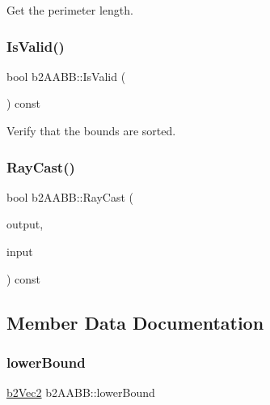 Get the perimeter length. 

\mbox{\label{structb2_a_a_b_b_a70bb45c086fcc2d7ee8694deb386070e}} 
\subsubsection{\texorpdfstring{IsValid()}{IsValid()}}
{\footnotesize\ttfamily bool b2\+A\+A\+B\+B\+::\+Is\+Valid (\begin{DoxyParamCaption}{ }\end{DoxyParamCaption}) const\hspace{0.3cm}{\ttfamily [inline]}}



Verify that the bounds are sorted. 

\mbox{\label{structb2_a_a_b_b_af6a8b26716ec07d326e5ce95556e8c7e}} 
\subsubsection{\texorpdfstring{RayCast()}{RayCast()}}
{\footnotesize\ttfamily bool b2\+A\+A\+B\+B\+::\+Ray\+Cast (\begin{DoxyParamCaption}\item[{\mbox{\hyperlink{structb2_ray_cast_output}{b2\+Ray\+Cast\+Output}} $\ast$}]{output,  }\item[{const \mbox{\hyperlink{structb2_ray_cast_input}{b2\+Ray\+Cast\+Input}} \&}]{input }\end{DoxyParamCaption}) const}



\subsection{Member Data Documentation}
\mbox{\label{structb2_a_a_b_b_ab94b68fbad8348b22b0522469b11bdb5}} 
\subsubsection{\texorpdfstring{lowerBound}{lowerBound}}
{\footnotesize\ttfamily \mbox{\hyperlink{structb2_vec2}{b2\+Vec2}} b2\+A\+A\+B\+B\+::lower\+Bound}



